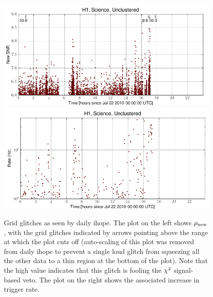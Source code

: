 \begin{figure}
  \includegraphics[width=0.5\linewidth]{figures/detchar/20100722_H1_0_UNCLUSTERED_newsnr_vs_time}
  \includegraphics[width=0.5\linewidth]{figures/detchar/20100722_H1_0_UNCLUSTERED_rate_vs_time}
  \caption[Grid glitches in daily ihope] {
  \label{f:daily_ihope_grid}
Grid glitches as seen by daily ihope.  The plot on the left shows
$\rho_{\textrm{new}}$, with the grid glitches indicated by arrows pointing above
the range at which the plot cuts off (auto-scaling of this plot was
removed from daily ihope to prevent a single loud glitch from
squeezing all the other data to a thin region at the bottom of the
plot).  Note that the high value indicates that this glitch is fooling 
the $\chi^2$ signal-based veto.  The plot on the right shows the
associated increase in trigger rate.
}
\end{figure}%

